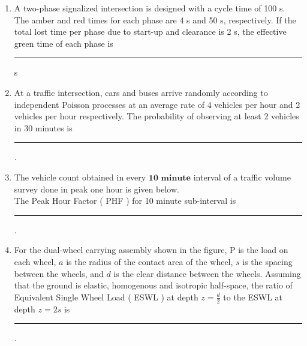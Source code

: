 \documentclass[journal]{IEEEtran}
\begin{document}
\begin{enumerate}
	\item A two-phase signalized intersection is designed with a cycle time of 100 s. The amber and red times for each phase are 4 s and 50 s, respectively. If the total lost time per phase due to start-up and clearance is 2 s, the effective green time of each phase is \rule{1cm}{0.1pt} s 
	\item At a traffic intersection, cars and buses arrive randomly according to independent Poisson processes at an average rate of 4 vehicles per hour and 2 vehicles per hour respectively. The probability of observing at least 2 vehicles in 30 minutes is \rule{1cm}{0.1pt} . 
	\item The vehicle count obtained in every $\textbf{10 minute}$ interval of a traffic volume survey done in peak one hour is given below. \\
		
		The Peak Hour Factor ( PHF ) for 10 minute sub-interval is \rule{1cm}{0.1pt} . 
	\item For the dual-wheel carrying assembly shown in the figure, P is the load on each wheel, $a$ is the radius of the contact area of the wheel, $s$ is the spacing between the wheels, and $d$ is the clear distance between the wheels. Assuming that the ground is elastic, homogenous and isotropic half-space, the ratio of Equivalent Single Wheel Load ( ESWL ) at depth $z = \frac{d}{2} $ to the ESWL at depth $z = 2s$ is \rule{1cm}{0.1pt}.  \\
		\begin{figure}[H]
			\centering
			
			\label{tab: Q_65}
		\end{figure}
\end{enumerate}
\end{document}
